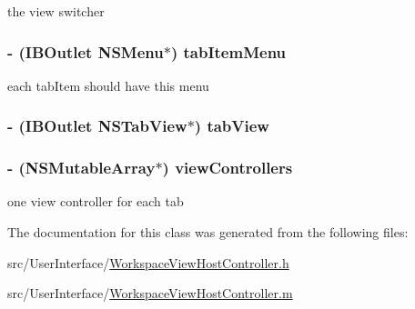 the view switcher \hypertarget{interface_workspace_view_host_controller_a78b24083a13da938a7e75ea92b8cff88}{
\subsubsection[{tab\-Item\-Menu}]{\setlength{\rightskip}{0pt plus 5cm}-\/ (I\-B\-Outlet N\-S\-Menu$\ast$) tab\-Item\-Menu\hspace{0.3cm}{\ttfamily [protected]}}}\label{interface_workspace_view_host_controller_a78b24083a13da938a7e75ea92b8cff88}
each tab\-Item should have this menu \hypertarget{interface_workspace_view_host_controller_ab4a1de68f4e691f316593c68f32fc9ba}{
\subsubsection[{tab\-View}]{\setlength{\rightskip}{0pt plus 5cm}-\/ (I\-B\-Outlet N\-S\-Tab\-View$\ast$) tab\-View\hspace{0.3cm}{\ttfamily [protected]}}}\label{interface_workspace_view_host_controller_ab4a1de68f4e691f316593c68f32fc9ba}
\hypertarget{interface_workspace_view_host_controller_a588ec80eb0221384c948a3ff05bd9372}{
\subsubsection[{view\-Controllers}]{\setlength{\rightskip}{0pt plus 5cm}-\/ (N\-S\-Mutable\-Array$\ast$) view\-Controllers\hspace{0.3cm}{\ttfamily [protected]}}}\label{interface_workspace_view_host_controller_a588ec80eb0221384c948a3ff05bd9372}
one view controller for each tab 

The documentation for this class was generated from the following files\-:\begin{DoxyCompactItemize}
\item 
src/\-User\-Interface/\hyperlink{_workspace_view_host_controller_8h}{Workspace\-View\-Host\-Controller.\-h}\item 
src/\-User\-Interface/\hyperlink{_workspace_view_host_controller_8m}{Workspace\-View\-Host\-Controller.\-m}\end{DoxyCompactItemize}
